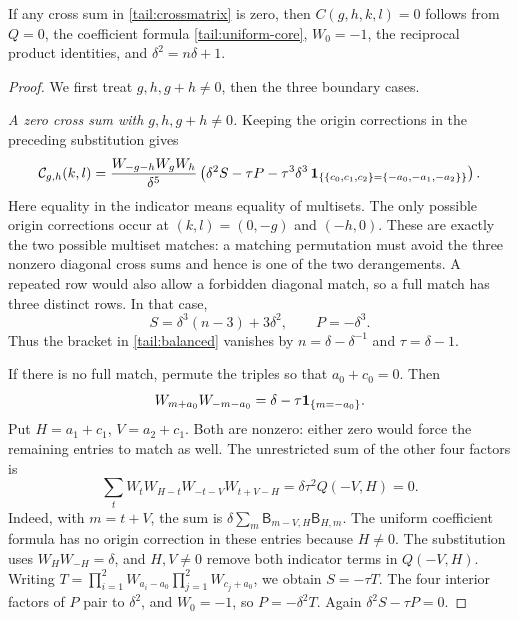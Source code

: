 \begin{lemma}\label{tail:collisions}
If any cross sum in \eqref{tail:crossmatrix} is zero, then
$C(g,h,k,l)=0$ follows from $Q=0$, the coefficient formula
\eqref{tail:uniform-core}, $W_0=-1$, the reciprocal product identities,
and $\delta^2=n\delta+1$.
\end{lemma}

\begin{proof}
We first treat $g,h,g+h\ne0$, then the three boundary cases.

\emph{A zero cross sum with $g,h,g+h\ne0$.}
Keeping the origin corrections in the preceding substitution gives
\begin{equation}\label{tail:balanced}
 \mathcal C_{g,h}(k,l)
 =\frac{W_{-g-h}W_gW_h}{\delta^5}
 \left(\delta^2S-\tau P-\tau^3\delta^3\,
 \mathbf1_{\{\{c_0,c_1,c_2\}=\{-a_0,-a_1,-a_2\}\}}\right).
\end{equation}
Here equality in the indicator means equality of multisets.
The only possible origin corrections occur at
$(k,l)=(0,-g)$ and $(-h,0)$. These are exactly the two possible
multiset matches: a matching permutation must avoid the three
nonzero diagonal cross sums and hence is one of the two derangements.
A repeated row would also allow a forbidden diagonal match, so a full
match has three distinct rows. In that case,
\[
 S=\delta^3(n-3)+3\delta^2,\qquad P=-\delta^3.
\]
Thus the bracket in \eqref{tail:balanced} vanishes by
$n=\delta-\delta^{-1}$ and $\tau=\delta-1$.

If there is no full match, permute the triples so that $a_0+c_0=0$.
Then
\[
 W_{m+a_0}W_{-m-a_0}=\delta-\tau\mathbf1_{\{m=-a_0\}}.
\]
Put $H=a_1+c_1$, $V=a_2+c_1$. Both are nonzero: either zero
would force the remaining entries to match as well. The unrestricted
sum of the other four factors is
\[
\sum_tW_tW_{H-t}W_{-t-V}W_{t+V-H}
       =\delta\tau^2Q(-V,H)=0.
\]
Indeed, with $m=t+V$, the sum is
$\delta\sum_m\mathsf B_{m-V,H}\mathsf B_{H,m}$.
The uniform coefficient formula has no origin correction in these
entries because $H\ne0$. The substitution uses
$W_HW_{-H}=\delta$, and $H,V\ne0$ remove both indicator terms
in $Q(-V,H)$.
Writing
$T=\prod_{i=1}^2W_{a_i-a_0}\prod_{j=1}^2W_{c_j+a_0}$,
we obtain $S=-\tau T$. The four interior factors of $P$ pair
to $\delta^2$, and $W_0=-1$, so $P=-\delta^2T$.
Again $\delta^2S-\tau P=0$.


\end{proof}
